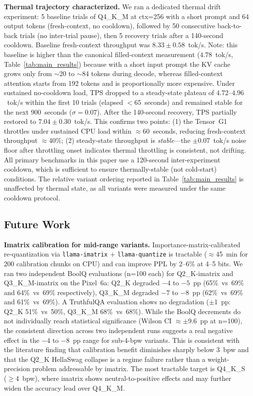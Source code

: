 \documentclass[conference]{IEEEtran}
\begin{document}
\textbf{Thermal trajectory characterized.}
We ran a dedicated thermal drift experiment: 5 baseline trials of Q4\_K\_M
at ctx=256 with a short prompt and 64 output tokens (fresh-context, no cooldown),
followed by 50 consecutive back-to-back trials (no inter-trial pause), then 5
recovery trials after a 140-second cooldown.
Baseline fresh-context throughput was $8.33\pm0.58$~tok/s.
Note: this baseline is higher than the canonical filled-context measurement
($4.78$~tok/s, Table~\ref{tab:main_results}) because with a short input prompt
the KV cache grows only from $\sim$20 to $\sim$84 tokens during decode, whereas
filled-context attention starts from 192 tokens and is proportionally more expensive.
Under sustained no-cooldown load, TPS dropped to a steady-state plateau of
$4.72$--$4.96$~tok/s within the first 10 trials (elapsed $<$65~seconds) and
remained stable for the next 900~seconds ($\sigma=0.07$).
After the 140-second recovery, TPS partially restored to $7.04\pm0.30$~tok/s.
This confirms two points: (1) the Tensor~G1 throttles under sustained CPU load
within $\approx$60~seconds, reducing fresh-context throughput $\approx40\%$;
(2) steady-state throughput is \emph{stable}---the $\pm$0.07~tok/s noise floor
after throttling onset indicates thermal throttling is consistent, not drifting.
All primary benchmarks in this paper use a 120-second inter-experiment cooldown,
which is sufficient to ensure thermally-stable (not cold-start) conditions.
The relative variant ordering reported in Table~\ref{tab:main_results} is
unaffected by thermal state, as all variants were measured under the same cooldown
protocol.

\subsection{Future Work}

\textbf{Imatrix calibration for mid-range variants.}
Importance-matrix-calibrated re-quantization via \texttt{llama-imatrix} + \texttt{llama-quantize}
is tractable (${\approx}$45~min for 200 calibration chunks on CPU) and can improve
PPL by 2--6\% at 4--5 bits.
We ran two independent BoolQ evaluations (n=100 each) for Q2\_K-imatrix and Q3\_K\_M-imatrix
on the Pixel~6a: Q2\_K degraded $-4$ to $-5$~pp (65\%~vs~69\% and 64\%~vs~69\% respectively),
Q3\_K\_M degraded $-7$ to $-8$~pp (62\%~vs~69\% and 61\%~vs~69\%).
A TruthfulQA evaluation shows no degradation ($\pm$1~pp: Q2\_K 51\%~vs~50\%, Q3\_K\_M 68\%~vs~68\%).
While the BoolQ decrements do not individually reach statistical significance (Wilson CI $\approx\pm$9.6~pp at n=100),
the consistent direction across two independent runs suggests a real negative effect
in the $-4$ to $-8$~pp range for sub-4-bpw variants.
This is consistent with the literature finding that calibration benefit diminishes
sharply below 3~bpw and that the Q2\_K HellaSwag collapse is a regime failure
rather than a weight-precision problem addressable by imatrix.
The most tractable target is Q4\_K\_S ($\geq$4~bpw), where imatrix shows neutral-to-positive
effects and may further widen the accuracy lead over Q4\_K\_M.
\end{document}
